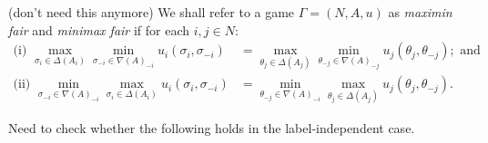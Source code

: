 \begin{definition}
	(don't need this anymore) We shall refer to a game $\Gamma = (N, A, u)$ as \textit{maximin fair} and \textit{minimax fair} if for each $i, j \in N$:
	\begin{align*}
		\text{(i) } \max_{\sigma_i \in \Delta(A_i)}\min_{\sigma_{-i} \in {\nabla(A)}_{-i}} u_i(\sigma_i, \sigma_{-i}) &= \max_{\theta_j \in \Delta(A_j)}\min_{\theta_{-j} \in {\nabla(A)}_{-j}} u_j(\theta_j, \theta_{-j}); \text{ and} \\
		\text{(ii) } \min_{\sigma_{-i} \in {\nabla(A)}_{-i}}\max_{\sigma_i \in \Delta(A_i)} u_i(\sigma_i, \sigma_{-i}) &= \min_{\theta_{-j} \in {\nabla(A)}_{-i}}\max_{\theta_j \in \Delta(A_j)} u_j(\theta_j, \theta_{-j}).
	\end{align*}
\end{definition}

Need to check whether the following holds in the label-independent case. 

